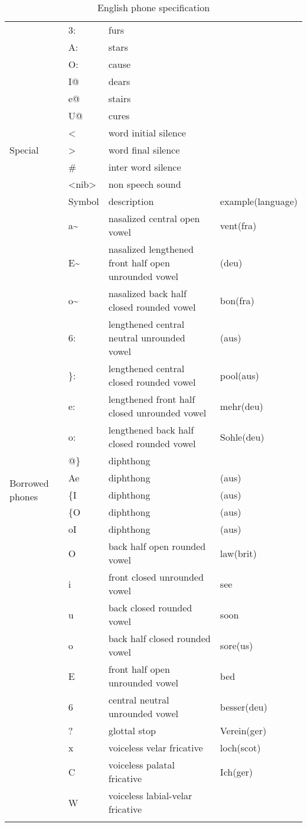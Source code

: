 \begin{longtable}{l|l|p{.3\linewidth}|l}
	& 3: & furs &\\
	& A: & stars &\\
	& O: & cause &\\
	& I@ & dears &\\
	& e@ & stairs &\\
	& U@ & cures &\\
	\hline
	\multirow{3}{*}{Special} &
	\textless & word initial silence & \\
	& \textgreater & word final silence & \\
	& \# & inter word silence & \\
	& \textless nib\textgreater & non speech sound & \\
	\hline\hline
	\multirow{22}{*}{Borrowed phones} & Symbol & description &
		example(language)\\
	\hline
	& a\textasciitilde & 
		nasalized central open vowel & vent(fra)\\
	& E\textasciitilde & 
		nasalized lengthened front half open unrounded vowel & (deu)\\
	& o\textasciitilde & 
		nasalized back half closed rounded vowel & bon(fra)\\
	& 6: & lengthened central neutral unrounded vowel & (aus)\\
	& \}: & lengthened central closed rounded vowel & pool(aus)\\
	& e: & lengthened front half closed unrounded vowel & mehr(deu)\\
	& o: & lengthened back half closed rounded vowel & Sohle(deu)\\
	& @\} & diphthong &\\
	& Ae & diphthong & (aus)\\
	& \{I & diphthong & (aus)\\
	& \{O & diphthong & (aus)\\
	& oI & diphthong & (aus)\\
	& O & back half open rounded vowel & law(brit)\\
	& i & front closed unrounded vowel & see\\
	& u & back closed rounded vowel & soon\\
	& o & back half closed rounded vowel & sore(us)\\
	& E & front half open unrounded vowel & bed\\
	& 6 & central neutral unrounded vowel & besser(deu)\\
	& ? & glottal stop & Verein(ger)\\
	& x & voiceless velar fricative & loch(scot)\\
	& C & voiceless palatal fricative & Ich(ger)\\
	& W & voiceless labial-velar fricative &\\
	\hline
	\caption{English phone specification}
\end{longtable}

